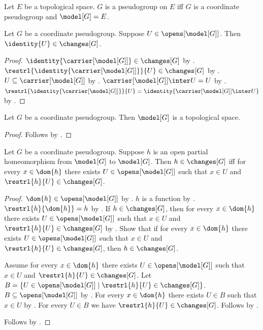 \begin{definition}\label{pseudogroup_on}
    Let $E$ be a topological space.
    $G$ is a pseudogroup on $E$ iff
        $G$ is a coordinate pseudogroup and $\model[G]=E$.
\end{definition}

\begin{theorem}\label{pseudogroup_open_identity}
    Let $G$ be a coordinate pseudogroup.
    Suppose $U\in\opens[\model[G]]$.
    Then $\identity{U}\in\changes[G]$.
\end{theorem}
\begin{proof}
    $\identity{\carrier[\model[G]]}\in\changes[G]$ by .
    $\restrl{\identity{\carrier[\model[G]]}}{U}\in\changes[G]$ by
        .
    $U\subseteq\carrier[\model[G]]$ by .
    $\carrier[\model[G]]\inter U=U$ by .
    $\restrl{\identity{\carrier[\model[G]]}}{U}
        =\identity{\carrier[\model[G]]\inter U}$ by .
\end{proof}

\begin{classification}\label{pseudogroup_model_is_topological}
    Let $G$ be a coordinate pseudogroup.
    Then $\model[G]$ is a topological space.
\end{classification}
\begin{proof}
    Follows by .
\end{proof}

\begin{theorem}\label{pseudogroup_change_iff_locally}
    Let $G$ be a coordinate pseudogroup.
    Suppose $h$ is an open partial homeomorphism from $\model[G]$ to $\model[G]$.
    Then $h\in\changes[G]$ iff
        for every $x\in\dom{h}$ there exists $U\in\opens[\model[G]]$ such that
            $x\in U$ and $\restrl{h}{U}\in\changes[G]$.
\end{theorem}
\begin{proof}
    $\dom{h}\in\opens[\model[G]]$ by .
    $h$ is a function by
        .
    $\restrl{h}{\dom{h}}=h$ by .
    If $h\in\changes[G]$, then
        for every $x\in\dom{h}$ there exists $U\in\opens[\model[G]]$ such that
            $x\in U$ and $\restrl{h}{U}\in\changes[G]$ by \auto.
    Show that if for every $x\in\dom{h}$ there exists $U\in\opens[\model[G]]$
        such that $x\in U$ and $\restrl{h}{U}\in\changes[G]$,
        then $h\in\changes[G]$.
    \begin{subproof}
        Assume for every $x\in\dom{h}$ there exists $U\in\opens[\model[G]]$
            such that $x\in U$ and $\restrl{h}{U}\in\changes[G]$.
        Let $B=\{U\in\opens[\model[G]]\mid\restrl{h}{U}\in\changes[G]\}$.
        $B\subseteq\opens[\model[G]]$ by .
        For every $x\in\dom{h}$ there exists $U\in B$ such that $x\in U$ by \auto.
        For every $U\in B$ we have $\restrl{h}{U}\in\changes[G]$.
        Follows by .
    \end{subproof}
    Follows by \auto.
\end{proof}

